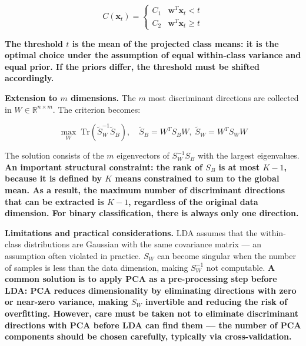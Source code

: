 $$C(\mathbf{x}_t) = \begin{cases} C_1 & \mathbf{w}^T\mathbf{x}_t < t \\ C_2 & \mathbf{w}^T\mathbf{x}_t \geq t \end{cases}$$

\textbf{The threshold $t$ is the mean of the projected class means: it is the optimal choice under the assumption of equal within-class variance and equal prior. If the priors differ, the threshold must be shifted accordingly.}

\textbf{Extension to $m$ dimensions.} The $m$ most discriminant directions are collected in $W \in \mathbb{R}^{n\times m}$. The criterion becomes:

$$\max_W \; \text{Tr}\!\left(\tilde{S}_W^{-1}\tilde{S}_B\right), \quad \tilde{S}_B = W^T S_B W,\; \tilde{S}_W = W^T S_W W$$

The solution consists of the $m$ eigenvectors of $S_W^{-1}S_B$ with the largest eigenvalues. \textbf{An important structural constraint: the rank of $S_B$ is at most $K-1$, because it is defined by $K$ means constrained to sum to the global mean. As a result, the maximum number of discriminant directions that can be extracted is $K-1$, regardless of the original data dimension. For binary classification, there is always only one direction.}

\textbf{Limitations and practical considerations.} LDA assumes that the within-class distributions are Gaussian with the same covariance matrix — an assumption often violated in practice. $S_W$ can become singular when the number of samples is less than the data dimension, making $S_W^{-1}$ not computable. \textbf{A common solution is to apply PCA as a pre-processing step before LDA: PCA reduces dimensionality by eliminating directions with zero or near-zero variance, making $S_W$ invertible and reducing the risk of overfitting. However, care must be taken not to eliminate discriminant directions with PCA before LDA can find them — the number of PCA components should be chosen carefully, typically via cross-validation.}
